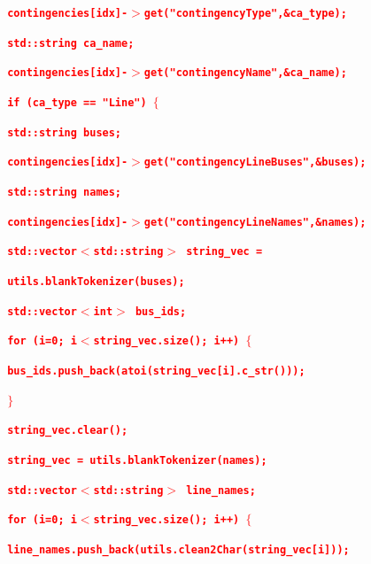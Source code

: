 \documentclass[12pt]{report} %
\begin{document}
\textcolor{red}{\texttt{\textbf{    contingencies[idx]-$\boldsymbol{\mathrm{>}}$get("contingencyType",\&ca\_type);}}}

\textcolor{red}{\texttt{\textbf{    std::string ca\_name;}}}

\textcolor{red}{\texttt{\textbf{    contingencies[idx]-$\boldsymbol{\mathrm{>}}$get("contingencyName",\&ca\_name);}}}

\textcolor{red}{\texttt{\textbf{    if (ca\_type == "Line") $\boldsymbol{\mathrm{\{}}$}}}

\textcolor{red}{\texttt{\textbf{      std::string buses;}}}

\textcolor{red}{\texttt{\textbf{      contingencies[idx]-$\boldsymbol{\mathrm{>}}$get("contingencyLineBuses",\&buses);}}}

\textcolor{red}{\texttt{\textbf{      std::string names;}}}

\textcolor{red}{\texttt{\textbf{      contingencies[idx]-$\boldsymbol{\mathrm{>}}$get("contingencyLineNames",\&names);}}}

\textcolor{red}{\texttt{\textbf{      std::vector$\boldsymbol{\mathrm{<}}$std::string$\boldsymbol{\mathrm{>}}$ string\_vec = }}}

\textcolor{red}{\texttt{\textbf{          utils.blankTokenizer(buses);}}}

\textcolor{red}{\texttt{\textbf{      std::vector$\boldsymbol{\mathrm{<}}$int$\boldsymbol{\mathrm{>}}$ bus\_ids;}}}

\textcolor{red}{\texttt{\textbf{      for (i=0; i$\boldsymbol{\mathrm{<}}$string\_vec.size(); i++) $\boldsymbol{\mathrm{\{}}$}}}

\textcolor{red}{\texttt{\textbf{        bus\_ids.push\_back(atoi(string\_vec[i].c\_str()));}}}

\textcolor{red}{\texttt{\textbf{      $\boldsymbol{\mathrm{\}}}$}}}

\textcolor{red}{\texttt{\textbf{      string\_vec.clear();}}}

\textcolor{red}{\texttt{\textbf{      string\_vec = utils.blankTokenizer(names);}}}

\textcolor{red}{\texttt{\textbf{      std::vector$\boldsymbol{\mathrm{<}}$std::string$\boldsymbol{\mathrm{>}}$ line\_names;}}}

\textcolor{red}{\texttt{\textbf{      for (i=0; i$\boldsymbol{\mathrm{<}}$string\_vec.size(); i++) $\boldsymbol{\mathrm{\{}}$}}}

\textcolor{red}{\texttt{\textbf{        line\_names.push\_back(utils.clean2Char(string\_vec[i]));}}}
\end{document}

